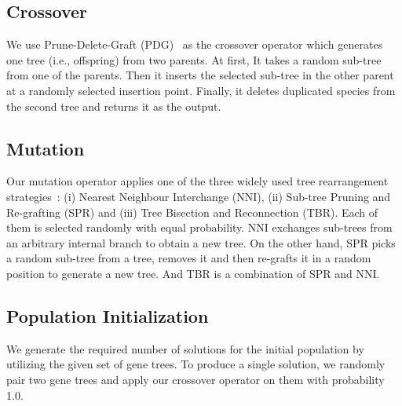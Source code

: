 \subsection{Crossover}\label{subsec:crossver}
We use Prune-Delete-Graft (PDG)~\cite{villalobos2018memetic} as the crossover operator which generates one tree (i.e., offspring) from two parents. At first, It takes a random sub-tree from one of the parents. Then it inserts the selected sub-tree in the other parent at a
randomly selected insertion point. Finally, it deletes duplicated species from the second tree and returns it as the output.

\subsection{Mutation} \label{subsec:mutation}
Our mutation operator applies one of the three widely used tree rearrangement strategies~\cite{felsenstein2004inferring}: (i) Nearest Neighbour
Interchange (NNI), (ii) Sub-tree Pruning and Re-grafting (SPR) and (iii) Tree Bisection and Reconnection (TBR). Each of them is selected randomly with equal probability. NNI exchanges sub-trees from an arbitrary internal branch to obtain a new tree. On the other hand, SPR picks a random sub-tree from a tree, removes it and then re-grafts it in a random position to generate a new tree. And TBR is a combination of SPR and NNI.

\subsection{Population Initialization}\label{subsec:init}
We generate the required number of solutions for the initial population by utilizing the given set of gene trees. To produce a single solution, we randomly pair two gene trees and apply our crossover operator on them with probability 1.0. 


